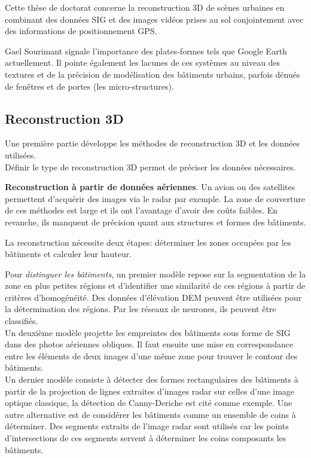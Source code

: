 \documentclass[11pt]{article}
\begin{document}
Cette thèse de doctorat concerne la reconstruction 3D de scènes urbaines en combinant des données SIG et des images vidéos prises au sol conjointement avec des informations de positionnement GPS.

Gael Sourimant signale l'importance des plates-formes tels que Google Earth actuellement. Il pointe également les lacunes de ces systèmes au niveau des textures et de la précision de modélisation des bâtiments urbains, parfois dénués de fenêtres et de portes (les micro-structures).

\subsection{Reconstruction 3D}

Une première partie développe les méthodes de reconstruction 3D et les données utilisées.\\
Définir le type de reconstruction 3D permet de préciser les données nécessaires.

\textbf{Reconstruction à partir de données aériennes}. Un avion ou des satellites permettent d'acquérir des images via le radar par exemple. La zone de couverture de ces méthodes est large et ils ont l'avantage d'avoir des coûts faibles. En revanche, ils manquent de précision quant aux structures et formes des bâtiments. 

La reconstruction nécessite deux étapes: déterminer les zones occupées par les bâtiments et calculer leur hauteur. 

Pour \textit{distinguer les bâtiments}, un premier modèle repose sur la segmentation de la zone en plus petites régions et d'identifier une similarité de ces régions à partir de critères d'homogénéité. Des données d'élévation DEM peuvent être utilisées pour la détermination des régions. Par les réseaux de neurones, ils peuvent être classifiés. \\
Un deuxième modèle projette les empreintes des bâtiments sous forme de SIG dans des photos aériennes obliques. Il faut ensuite une mise en correspondance entre les éléments de deux images d'une même zone pour trouver le contour des bâtiments. \\
Un dernier modèle consiste à détecter des formes rectangulaires des bâtiments à partir de la projection de lignes extraites d'images radar sur celles d'une image optique classique, la détection de Canny-Deriche est cité comme exemple. Une autre alternative est de considérer les bâtiments comme un ensemble de coins à déterminer. Des segments extraits de l'image radar sont utilisés car les points d'intersections de ces segments servent à déterminer les coins composants les bâtiments.
\end{document}
